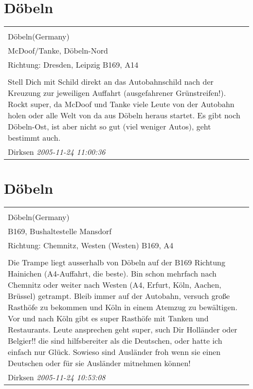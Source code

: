 \documentclass[a4paper,12pt]{article}
\begin{document}
\section{Döbeln}
\begin{tabular}{|p{13cm}|}
\hline\\
Döbeln(Germany)\\
McDoof/Tanke, Döbeln-Nord\\
Richtung: Dresden, Leipzig B169, A14 \\
\hline\\
Stell Dich mit Schild direkt an das Autobahnschild nach der Kreuzung zur jeweiligen Auffahrt (ausgefahrener Grünstreifen!). Rockt super, da McDoof und Tanke viele Leute von der Autobahn holen oder alle Welt von da aus Döbeln heraus startet. Es gibt noch Döbeln-Ost, ist aber nicht so gut (viel weniger Autos), geht bestimmt auch. \\
Dirksen \textit{ 2005-11-24 11:00:36 }\\\hline
\end{tabular}


\section{Döbeln}
\begin{tabular}{|p{13cm}|}
\hline\\
Döbeln(Germany)\\
B169, Bushaltestelle Mansdorf\\
Richtung: Chemnitz, Westen (Westen) B169, A4 \\
\hline\\
Die Trampe liegt ausserhalb von Döbeln auf der B169 Richtung Hainichen (A4-Auffahrt, die beste). Bin schon mehrfach nach Chemnitz oder weiter nach Westen (A4, Erfurt, Köln, Aachen, Brüssel) getrampt. Bleib immer auf der Autobahn, versuch große Rasthöfe zu bekommen und Köln in einem Atemzug zu bewältigen. Vor und nach Köln gibt es super Rasthöfe mit Tanken und Restaurants. Leute ansprechen geht super, such Dir Holländer oder Belgier!! die sind hilfsbereiter als die Deutschen, oder hatte ich einfach nur Glück. Sowieso sind Ausländer froh wenn sie einen Deutschen oder für sie Ausländer mitnehmen können! \\
Dirksen \textit{ 2005-11-24 10:53:08 }\\\hline
\end{tabular}
\end{document}
